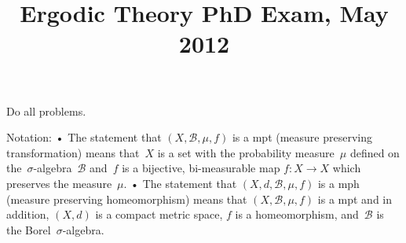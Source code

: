 \documentclass[11pt,letterpaper]{article}
\title{Ergodic Theory PhD Exam, May 2012}
\author{}
\date{}
\newenvironment{examinstructions}{%
  \par\begingroup\itshape
}{%
  \par\endgroup\vspace{0.18em}
}
\begin{document}
\maketitle
\thispagestyle{empty}
\begin{examinstructions}
Do all problems.
\end{examinstructions}
\begin{examinstructions}
Notation: • The statement that \((X,\mathcal{B},\mu,f)\) is a mpt (measure preserving transformation) means that~\(X\) is a set with the probability measure~\(\mu\) defined on the~\(\sigma\)-algebra~\(\mathcal{B}\) and~\(f\) is a bijective, bi-measurable map \(f:X\to X\) which preserves the measure~\(\mu\). • The statement that \((X,d,\mathcal{B},\mu,f)\) is a mph (measure preserving homeomorphism) means that \((X,\mathcal{B},\mu,f)\) is a mpt and in addition, \((X,d)\) is a compact metric space, \(f\) is a homeomorphism, and~\(\mathcal{B}\) is the Borel~\(\sigma\)-algebra.
\end{examinstructions}
\end{document}
